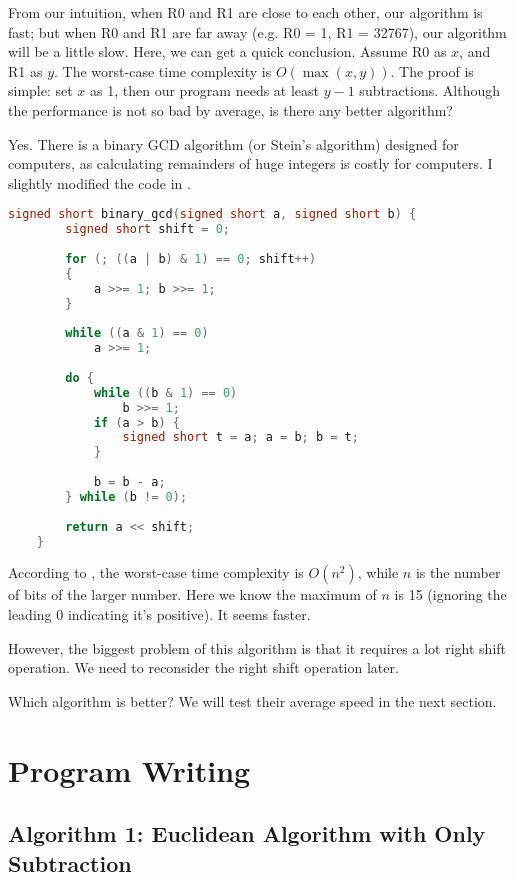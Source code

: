 \documentclass{article}
\begin{document}
	From our intuition, when R0 and R1 are close to each other, our algorithm is fast; but when R0 and R1 are far away (e.g. R0 = 1, R1 = 32767), our algorithm will be a little slow. Here, we can get a quick conclusion. Assume R0 as $x$, and R1 as $y$. The worst-case time complexity is $O(\max(x, y))$. The proof is simple: set $x$ as 1, then our program needs at least $y - 1$ subtractions. Although the performance is not so bad by average, is there any better algorithm?
	
	Yes. There is a binary GCD algorithm (or Stein's algorithm) designed for computers, as calculating remainders of huge integers is costly for computers. I slightly modified the code in \cite{bgcd}.
	
	\begin{lstlisting}[language=c, caption={Binary GCD algorithm implemented in C}]
	signed short binary_gcd(signed short a, signed short b) {
		signed short shift = 0;
		
		for (; ((a | b) & 1) == 0; shift++)
		{
			a >>= 1; b >>= 1;
		}
		
		while ((a & 1) == 0)
			a >>= 1;
		
		do {
			while ((b & 1) == 0)
				b >>= 1;
			if (a > b) {
				signed short t = a; a = b; b = t;
			}
			
			b = b - a;
		} while (b != 0);
		
		return a << shift;
	}
	\end{lstlisting}
	
	According to \cite{bgcd}, the worst-case time complexity is $O(n^2)$, while $n$ is the number of bits of the larger number. Here we know the maximum of $n$ is 15 (ignoring the leading 0 indicating it's positive). It seems faster.
	
	However, the biggest problem of this algorithm is that it requires a lot right shift operation. We need to reconsider the right shift operation later.
	
	Which algorithm is better? We will test their average speed in the next section.
	
	\section{Program Writing}
	
	\subsection{Algorithm 1: Euclidean Algorithm with Only Subtraction}
	
\end{document}
